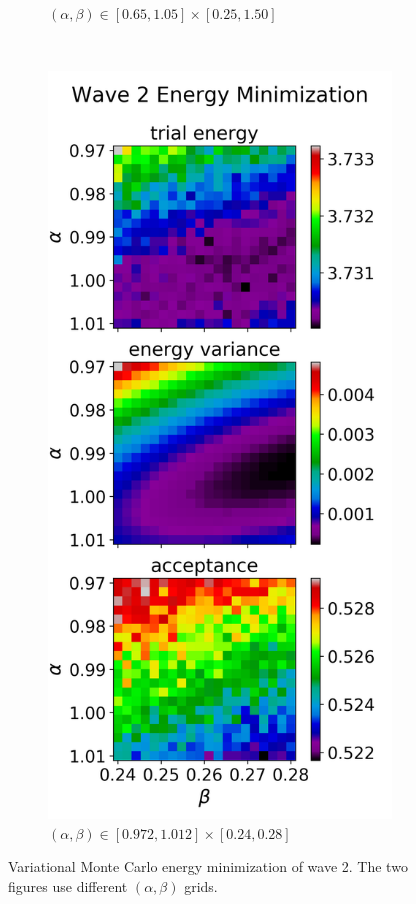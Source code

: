 \documentclass[nofootinbib,reprint,english]{revtex4-1}
\begin{document}
\begin{figure}[h!]
\begin{subfigure}[b]{0.48\textwidth}
	\caption{\((\alpha,\beta)\in[0.65,1.05]\times[0.25,1.50]\)}\label{fig:wave2_optimization1}
	\end{subfigure}
	~
	\begin{subfigure}[b]{0.48\textwidth}
	\centering
	\includegraphics[scale=0.7]{../results/wave2/energy_minimization_5.png}
	\caption{\((\alpha,\beta)\in[0.972,1.012]\times[0.24,0.28]\)}\label{fig:wave2_optimization2}
	\end{subfigure}
\caption{Variational Monte Carlo energy minimization of wave 2. The two figures use different \((\alpha,\beta)\) grids.}\label{fig:wave2_optimization}
\end{figure}
\clearpage
\twocolumngrid
\end{document}
